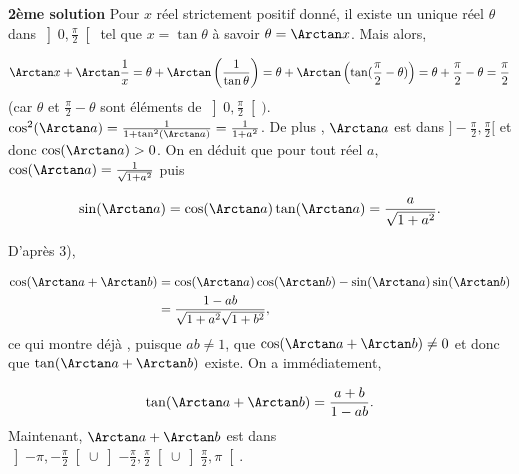 {\begin{enumerate}
{\begin{center}
\end{center}
\textbf{2ème solution} Pour $x$ réel strictement positif donné, il existe un unique réel $\theta$ dans
$\left]0,\frac{\pi}{2}\right[$ tel que $x=\tan\theta$ à savoir $\theta=\Arctan x$.
Mais alors,

$$\Arctan x+\Arctan\frac{1}{x}=\theta+\Arctan\left(\frac{1}{\tan\theta}\right)
=\theta+\Arctan\left(\tan(\frac{\pi}{2}-\theta)\right)
=\theta+\frac{\pi}{2}-\theta=\frac{\pi}{2}$$
(car $\theta$ et $\frac{\pi}{2}-\theta$ sont éléments de
$\left]0,\frac{\pi}{2}\right[)$.
$\cos^2(\Arctan a)=\frac{1}{1+\tan^2(\Arctan a)}=\frac{1}{1+a^2}$. De plus , $\Arctan
a$ est dans $]-\frac{\pi}{2},\frac{\pi}{2}[$ et donc $\cos(\Arctan a)>0$.
On en déduit que pour tout réel $a$, $\cos(\Arctan a)=\frac{1}{\sqrt{1+a^2}}$ puis

$$\sin(\Arctan a)=\cos(\Arctan a)\tan(\Arctan a)=\frac{a}{\sqrt{1+a^2}}.$$

\begin{center}
\end{center}
D'après 3),

\begin{align*}
\cos(\Arctan a+\Arctan b) &= \cos(\Arctan a)\cos(\Arctan b)-\sin(\Arctan a)\sin(\Arctan b) \\
&= \frac{1-ab}{\sqrt{1+a^2}\sqrt{1+b^2}},
\end{align*}
ce qui montre déjà , puisque $ab\neq1$, que
$\cos(\Arctan a+\Arctan b)\neq0$ et donc que $\tan(\Arctan a+\Arctan b)$ existe. On a immédiatement,

$$\tan(\Arctan a+\Arctan b)=\frac{a+b}{1-ab}.$$
Maintenant, $\Arctan a+\Arctan b$ est dans
$\left]-\pi,-\frac{\pi}{2}\right[\cup\left]-\frac{\pi}{2},\frac{\pi}{2}\right[\cup\left]\frac{\pi}{2},\pi\right[$.

}
\end{enumerate}}
